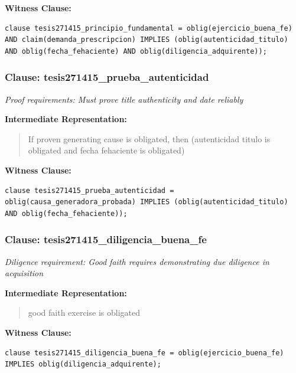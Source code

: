 \documentclass[11pt,a4paper]{article}
\begin{document}
\textbf{Witness Clause:}

\begin{lstlisting}[style=witnessstyle, language=Witness]
clause tesis271415_principio_fundamental = oblig(ejercicio_buena_fe) AND claim(demanda_prescripcion) IMPLIES (oblig(autenticidad_titulo) AND oblig(fecha_fehaciente) AND oblig(diligencia_adquirente));
\end{lstlisting}

\subsubsection{Clause: tesis271415\_prueba\_autenticidad}

\textit{Proof requirements: Must prove title authenticity and date reliably}

\textbf{Intermediate Representation:}

\begin{quote}
If proven generating cause is obligated, then (autenticidad titulo is obligated and fecha fehaciente is obligated)
\end{quote}

\textbf{Witness Clause:}

\begin{lstlisting}[style=witnessstyle, language=Witness]
clause tesis271415_prueba_autenticidad = oblig(causa_generadora_probada) IMPLIES (oblig(autenticidad_titulo) AND oblig(fecha_fehaciente));
\end{lstlisting}

\subsubsection{Clause: tesis271415\_diligencia\_buena\_fe}

\textit{Diligence requirement: Good faith requires demonstrating due diligence in acquisition}

\textbf{Intermediate Representation:}

\begin{quote}
good faith exercise is obligated
\end{quote}

\textbf{Witness Clause:}

\begin{lstlisting}[style=witnessstyle, language=Witness]
clause tesis271415_diligencia_buena_fe = oblig(ejercicio_buena_fe) IMPLIES oblig(diligencia_adquirente);
\end{lstlisting}
\end{document}

